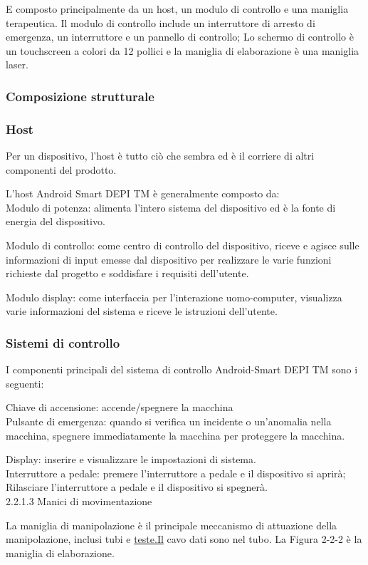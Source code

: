 \documentclass[10pt]{article}
\begin{document}
E composto principalmente da un host, un modulo di controllo e una maniglia terapeutica. Il modulo di controllo include un interruttore di arresto di emergenza, un interruttore e un pannello di controllo; Lo schermo di controllo è un touchscreen a colori da 12 pollici e la maniglia di elaborazione è una maniglia laser.

\subsubsection{Composizione strutturale}
\subsubsection{Host}
Per un dispositivo, l'host è tutto ciò che sembra ed è il corriere di altri componenti del prodotto.

L'host Android Smart DEPI TM è generalmente composto da:\\
Modulo di potenza: alimenta l'intero sistema del dispositivo ed è la fonte di energia del dispositivo.

Modulo di controllo: come centro di controllo del dispositivo, riceve e agisce sulle informazioni di input emesse dal dispositivo per realizzare le varie funzioni richieste dal progetto e soddisfare i requisiti dell'utente.

Modulo display: come interfaccia per l'interazione uomo-computer, visualizza varie informazioni del sistema e riceve le istruzioni dell'utente.

\subsubsection{Sistemi di controllo}
I componenti principali del sistema di controllo Android-Smart DEPI TM sono i seguenti:

Chiave di accensione: accende/spegnere la macchina\\
Pulsante di emergenza: quando si verifica un incidente o un'anomalia nella macchina, spegnere immediatamente la macchina per proteggere la macchina.

Display: inserire e visualizzare le impostazioni di sistema.\\
Interruttore a pedale: premere l'interruttore a pedale e il dispositivo si aprirà; Rilasciare l'interruttore a pedale e il dispositivo si spegnerà.\\
2.2.1.3 Manici di movimentazione

La maniglia di manipolazione è il principale meccanismo di attuazione della manipolazione, inclusi tubi e \href{http://teste.Il}{teste.Il} cavo dati sono nel tubo. La Figura 2-2-2 è la maniglia di elaborazione.
\end{document}

